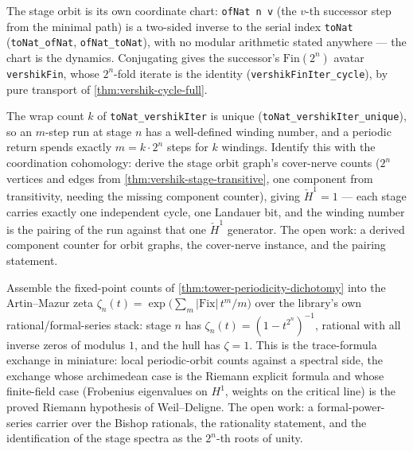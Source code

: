 \begin{theorem}\label{thm:vershik-serial-chart}\leanok{}
The stage orbit is its own coordinate chart: \texttt{ofNat n v} (the $v$-th
successor step from the minimal path) is a two-sided inverse to the serial
index \texttt{toNat} (\texttt{toNat\_ofNat}, \texttt{ofNat\_toNat}), with no
modular arithmetic stated anywhere --- the chart is the dynamics. Conjugating
gives the successor's $\mathrm{Fin}(2^n)$ avatar \texttt{vershikFin}, whose
$2^n$-fold iterate is the identity (\texttt{vershikFinIter\_cycle}), by pure
transport of \cref{thm:vershik-cycle-full}.
\end{theorem}

\begin{theorem}\label{thm:vershik-winding-exchange}\notready{}
The wrap count $k$ of \texttt{toNat\_vershikIter} is unique
(\texttt{toNat\_vershikIter\_unique}), so an $m$-step run at stage $n$ has a
well-defined winding number, and a periodic return spends exactly $m = k
\cdot 2^n$ steps for $k$ windings. Identify this with the coordination
cohomology: derive the stage orbit graph's cover-nerve counts ($2^n$
vertices and edges from \cref{thm:vershik-stage-transitive}, one component
from transitivity, needing the missing component counter), giving
$\check H^1 = 1$ --- each stage carries exactly one independent cycle, one
Landauer bit, and the winding number is the pairing of the run against that
one $\check H^1$ generator. The open work: a derived component counter for
orbit graphs, the cover-nerve instance, and the pairing statement.
\end{theorem}

\begin{theorem}\label{thm:tower-artin-mazur-zeta}\notready{}
Assemble the fixed-point counts of \cref{thm:tower-periodicity-dichotomy}
into the Artin--Mazur zeta $\zeta_n(t) = \exp\bigl(\sum_m
|\mathrm{Fix}|\, t^m/m\bigr)$ over the library's own rational/formal-series
stack: stage $n$ has $\zeta_n(t) = (1 - t^{2^n})^{-1}$, rational with all
inverse zeros of modulus $1$, and the hull has $\zeta = 1$. This is the
trace-formula exchange in miniature: local periodic-orbit counts against a
spectral side, the exchange whose archimedean case is the Riemann explicit
formula and whose finite-field case (Frobenius eigenvalues on $H^1$, weights
on the critical line) is the proved Riemann hypothesis of Weil--Deligne. The
open work: a formal-power-series carrier over the Bishop rationals, the
rationality statement, and the identification of the stage spectra as the
$2^n$-th roots of unity.
\end{theorem}

